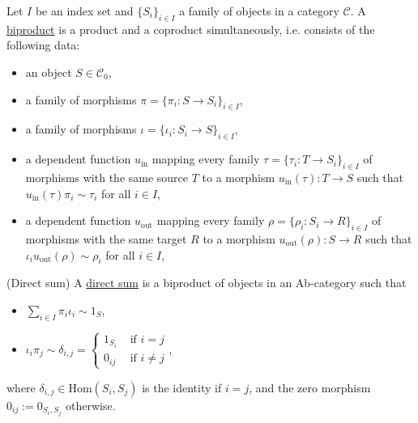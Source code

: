 \begin{definition}[Biproduct]\label{def:biproduct}
Let $I$ be an index set and $\{S_{i}\}_{i\in I}$ a family of objects in a category $\mathcal{C}$.
A \ul{biproduct} is a product and a coproduct simultaneously, i.e. consists of the following data:
\begin{itemize}
\item an object $S \in \mathcal{C}_{0}$,
\item a family of morphisms $\pi = \{ \pi_{i} : S \rightarrow S_{i} \}_{i\in I}$,
\item a family of morphisms $\iota = \{ \iota_{i} : S_{i} \rightarrow S \}_{i\in I}$,
\item a dependent function $u_{\text{in}}$ mapping every family $\tau = \{ \tau_{i} : T \rightarrow S_{i} \}_{i\in I}$ of morphisms
with the same source $T$ to a morphism
$u_{\text{in}}(\tau) : T \rightarrow S$ such that $u_{\text{in}}(\tau) \pi_{i} \sim \tau_{i}$ for all $i \in I$,
\item a dependent function $u_{\text{out}}$ mapping every family $\rho = \{ \rho_{i} : S_{i} \rightarrow R \}_{i\in I}$ of morphisms
with the same target $R$ to a morphism
$u_{\text{out}}(\rho) : S \rightarrow R$ such that $\iota_{i} u_{\text{out}}(\rho) \sim \rho_{i}$ for all $i \in I$,
\end{itemize}
\end{definition}

\begin{definition}{(Direct sum)}\label{def:direct_sum}
A \ul{direct sum} is a biproduct of objects in an Ab-category such that
\begin{itemize}
\item $\sum_{i\in I}  \pi_{i} \iota_{i} \sim 1_{S}$,
\item $ \iota_{i} \pi_{j} \sim \delta_{i, j} =  \begin{cases}
            1_{S_{i}} & \text{ if } i = j  \\
            0_{ij} & \text{ if } i \neq j
        \end{cases}$,
\end{itemize}
where $\delta_{i, j} \in \mathrm{Hom}(S_{i}, S_{j})$ is the identity if $i = j$, and the zero morphism $0_{ij} := 0_{S_{i}, S_{j}}$ otherwise.
\end{definition}

